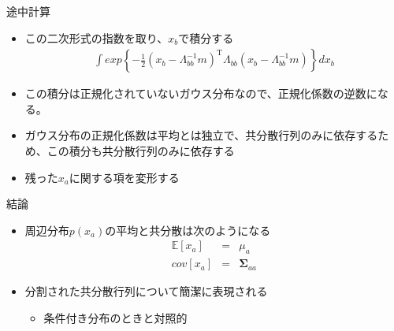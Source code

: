\begin{frame}{途中計算}
 \begin{itemize}
  \item この二次形式の指数を取り、$x_b$で積分する
        \begin{eqnarray}
         \int exp\left\{-\frac{1}{2}(x_b-\Lambda_{bb}^{-1}m)^{\mathrm{T}}\Lambda_{bb}(x_b-\Lambda_{bb}^{-1}m)\right\}dx_b
        \end{eqnarray}
  \item この積分は正規化されていないガウス分布なので、正規化係数の逆数になる。
  \item ガウス分布の正規化係数は平均とは独立で、共分散行列のみに依存するため、この積分も共分散行列のみに依存する
  \item 残った$x_a$に関する項を変形する
 \end{itemize}
\end{frame}

\begin{frame}{結論}
 \begin{itemize}
  \item 周辺分布$p(x_a)$の平均と共分散は次のようになる
        \begin{eqnarray}
         \mathbb{E}[x_a] &=&  \mu_a\\
         cov[x_a]&=&\bm{\Sigma}_{aa}
        \end{eqnarray}
  \item 分割された共分散行列について簡潔に表現される
        \begin{itemize}
         \item 条件付き分布のときと対照的
        \end{itemize}
 \end{itemize}
\end{frame}

